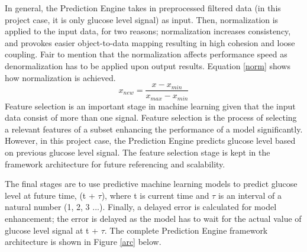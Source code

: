 In general, the Prediction Engine takes in preprocessed filtered data (in this project case, it is only glucose level signal) as input. Then, normalization is applied to the input data, for two reasons; normalization increases consistency, and provokes easier object-to-data mapping resulting in high cohesion and loose coupling. Fair to mention that the normalization affects performance speed as denormalization has to be applied upon output results. Equation \ref{norm} shows how normalization is achieved. 
\begin{equation}
x_{new} = \frac{x-x_{min}}{x_{max}-x_{min}}
\label{norm}
\end{equation}
Feature selection is an important stage in machine learning given that the input data consist of more than one signal. Feature selection is the process of selecting a relevant features of a subset enhancing the performance of a model significantly. However, in this project case, the Prediction Engine predicts glucose level based on previous glucose level signal. The feature selection stage is kept in the framework architecture for future referencing and scalability. 

\pagebreak

The final stages are to use predictive machine learning models to predict glucose level at future time, (t + \ensuremath{\tau}), where t is current time and \ensuremath{\tau} is an interval of a natural number (1, 2, 3 ...). Finally, a delayed error is calculated for model enhancement; the error is delayed as the model has to wait for the actual value of glucose level signal at t + \ensuremath{\tau}. The complete Prediction Engine framework architecture is shown in Figure \ref{arc} below.

